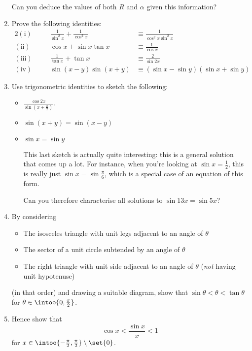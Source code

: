 \begin{enumerate}
  Can you deduce the values of both \(R\) and \(\alpha\) given this information?
 \item
  Prove the following identities:
  \begin{alignat*}2
   (\mathrm{i})&&\quad\frac 1{\sin^2 x} + \frac 1{\cos^2 x}
   &\equiv \frac 1{\cos^2 x \sin^2 x} \\
   (\mathrm{ii})&&\quad\cos x + \sin x \tan x
   &\equiv \frac 1{\cos x} \\
   (\mathrm{iii})&&\quad\frac 1{\tan x} + \tan x
   &\equiv \frac 2{\sin 2x} \\
   (\mathrm{iv})&&\quad\sin(x - y) \sin(x + y)
   &\equiv (\sin x - \sin y)(\sin x + \sin y)
  \end{alignat*}
 \item
  Use trigonometric identities to sketch the following:
  \begin{itemize}
   \item
    \(\displaystyle \frac{\cos 2x}{\sin(x + \frac \pi 2)}\).
   \item
    \(\sin(x + y) = \sin(x - y)\)
   \item
    \(\sin x = \sin y\)

    This last sketch is actually quite interesting: this is a general solution
    that comes up a lot. For instance, when you're looking at
    \(\sin x = \frac 12\), this is really just \(\sin x = \sin \frac \pi 6\),
    which is a special case of an equation of this form.

    Can you therefore characterise all solutions to \(\sin 13x = \sin 5x\)?
  \end{itemize}
 \item
  By considering
  \begin{itemize}
   \item
    The isosceles triangle with unit legs adjacent to an angle of \(\theta\)
   \item
    The sector of a unit circle subtended by an angle of \(\theta\)
   \item
    The right triangle with unit side adjacent to an angle of \(\theta\)
    (\emph{not} having unit hypotenuse)
  \end{itemize}
  (in that order) and drawing a suitable diagram, show that
  \(\sin \theta < \theta < \tan \theta\) for
  \(\theta \in \intoo{0, \frac \pi 2}\).
 \item
  Hence show that
  \begin{equation*}
   \cos x < \frac{\sin x}x < 1
  \end{equation*}
  for \(x \in \intoo{-\frac \pi 2, \frac \pi 2} \setminus \set{0}\).


\end{enumerate}
